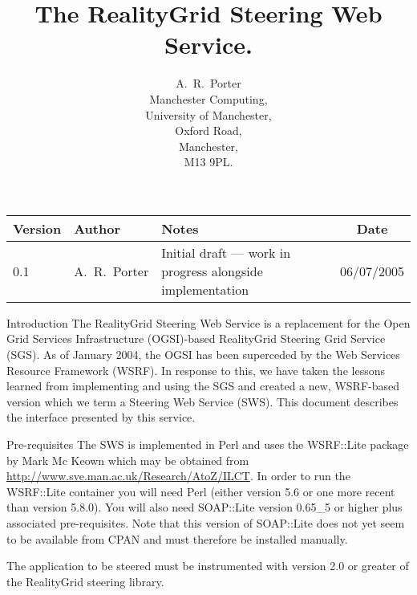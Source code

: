 \documentclass[a4paper]{article}
\begin{document}
\title{The RealityGrid Steering Web Service.}

\author{A.~R.~Porter \\
Manchester Computing,\\University of Manchester,\\Oxford Road,\\
Manchester,\\M13 9PL.}


\maketitle

\begin{table}
\begin{center}
\begin{tabular}{l|l|p{5cm}|c}
\hline\hline
Version & Author & Notes & Date \\
\hline
0.1 & A.~R.~Porter & Initial draft --- work in progress alongside implementation & 06/07/2005\\
\hline\hline
\end{tabular}
\end{center}
\end{table}

\pagebreak

\tableofcontents

\pagebreak

\begin{section}{Introduction}
The RealityGrid Steering Web Service is a replacement for the Open
Grid Services Infrastructure (OGSI)-based RealityGrid Steering Grid
Service (SGS).  As of January 2004, the OGSI has been superceded by
the Web Services Resource Framework (WSRF).  In response to this, we
have taken the lessons learned from implementing and using the SGS and
created a new, WSRF-based version which we term a Steering Web Service
(SWS).  This document describes the interface presented by this
service.
\end{section}


\begin{section}{Pre-requisites}
The SWS is implemented in Perl and uses the WSRF::Lite package by Mark
Mc Keown which may be obtained from
\url{http://www.sve.man.ac.uk/Research/AtoZ/ILCT}.  In order to run
the WSRF::Lite container you will need Perl (either version 5.6 or
one more recent than version 5.8.0).  You will also need SOAP::Lite version
0.65\_5 or higher plus associated pre-requisites.  Note that this
version of SOAP::Lite does not yet seem to be available from CPAN and
must therefore be installed manually.

The application to be steered must be instrumented with version 2.0 or
greater of the RealityGrid steering library.
\end{section}
\end{document}
